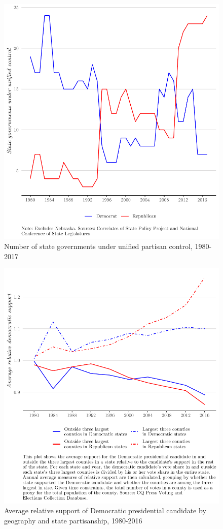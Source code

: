 \documentclass[12pt]{article}
\begin{document}
\begin{figure}[ht]
\caption{Number of state governments under unified partisan control, 1980-2017}
\centering
\includegraphics[width=.75\textwidth]{plots/party_control}
\end{figure}

\begin{figure}[ht]
\caption{Average relative support of Democratic presidential candidate by geography and state partisanship, 1980-2016}
\centering
\includegraphics[width=.75\textwidth]{plots/county_support}
\end{figure}







\newpage
\printbibliography
 
\end{document}
